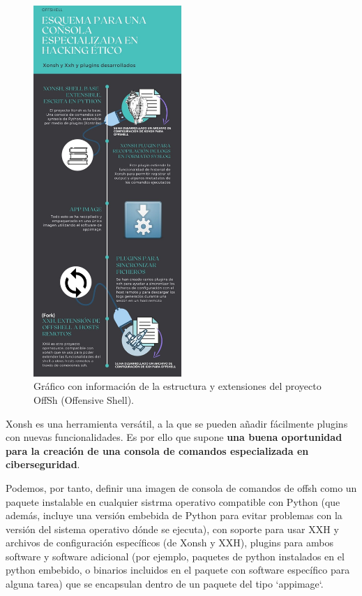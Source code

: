 \begin{figure}[!hbt]
  \centering
  \includegraphics[width=0.5\textwidth]{imagenes/infografico.jpg}
  \caption{Gráfico con información de la estructura y extensiones del proyecto OffSh (Offensive Shell).}
  \label{infographic}
\end{figure}

Xonsh es una herramienta versátil, a la que se pueden añadir fácilmente plugins con nuevas funcionalidades. Es por ello que supone  \textbf{una buena oportunidad para la creación de una consola de comandos especializada en ciberseguridad}. 

Podemos, por tanto, definir una imagen de consola de comandos de offsh como un paquete instalable en cualquier sistrma operativo compatible con Python (que además, incluye una versión embebida de Python para evitar problemas con la versión del sistema operativo dónde se ejecuta), con soporte para usar XXH y archivos de configuración específicos (de Xonsh y XXH), plugins para ambos software y software adicional (por ejemplo, paquetes de python instalados en el python embebido, o binarios incluidos en el paquete con software específico para alguna tarea) que se encapsulan dentro de un paquete del tipo `appimage`.

